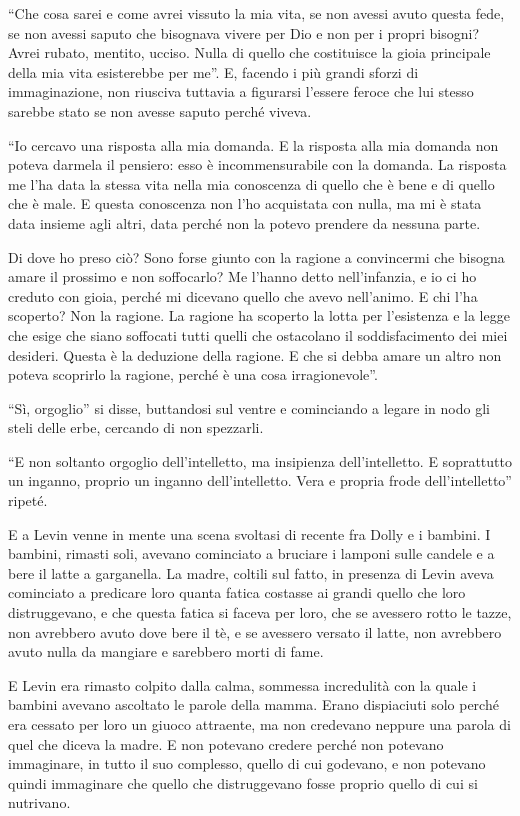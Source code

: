 ``Che cosa sarei e come avrei vissuto la mia vita, se non avessi avuto questa fede, se non avessi saputo che bisognava vivere per Dio e non per i propri bisogni? Avrei rubato, mentito, ucciso. Nulla di quello che costituisce la gioia principale della mia vita esisterebbe per me''. E, facendo i più grandi sforzi di immaginazione, non riusciva tuttavia a figurarsi l'essere feroce che lui stesso sarebbe stato se non avesse saputo perché viveva. 

``Io cercavo una risposta alla mia domanda. E la risposta alla mia domanda non poteva darmela il pensiero: esso è incommensurabile con la domanda. La risposta me l'ha data la stessa vita nella mia conoscenza di quello che è bene e di quello che è male. E questa conoscenza non l'ho acquistata con nulla, ma mi è stata data insieme agli altri, data perché non la potevo prendere da nessuna parte. 

Di dove ho preso ciò? Sono forse giunto con la ragione a convincermi che bisogna amare il prossimo e non soffocarlo? Me l'hanno detto nell'infanzia, e io ci ho creduto con gioia, perché mi dicevano quello che avevo nell'animo. E chi l'ha scoperto? Non la ragione. La ragione ha scoperto la lotta per l'esistenza e la legge che esige che siano soffocati tutti quelli che ostacolano il soddisfacimento dei miei desideri. Questa è la deduzione della ragione. E che si debba amare un altro non poteva scoprirlo la ragione, perché è una cosa irragionevole''. 

``Sì, orgoglio'' si disse, buttandosi sul ventre e cominciando a legare in nodo gli steli delle erbe, cercando di non spezzarli. 

``E non soltanto orgoglio dell'intelletto, ma insipienza dell'intelletto. E soprattutto un inganno, proprio un inganno dell'intelletto. Vera e propria frode dell'intelletto'' ripeté. 

E a Levin venne in mente una scena svoltasi di recente fra Dolly e i bambini. I bambini, rimasti soli, avevano cominciato a bruciare i lamponi sulle candele e a bere il latte a garganella. La madre, coltili sul fatto, in presenza di Levin aveva cominciato a predicare loro quanta fatica costasse ai grandi quello che loro distruggevano, e che questa fatica si faceva per loro, che se avessero rotto le tazze, non avrebbero avuto dove bere il tè, e se avessero versato il latte, non avrebbero avuto nulla da mangiare e sarebbero morti di fame. 

E Levin era rimasto colpito dalla calma, sommessa incredulità con la quale i bambini avevano ascoltato le parole della mamma. Erano dispiaciuti solo perché era cessato per loro un giuoco attraente, ma non credevano neppure una parola di quel che diceva la madre. E non potevano credere perché non potevano immaginare, in tutto il suo complesso, quello di cui godevano, e non potevano quindi immaginare che quello che distruggevano fosse proprio quello di cui si nutrivano. 

